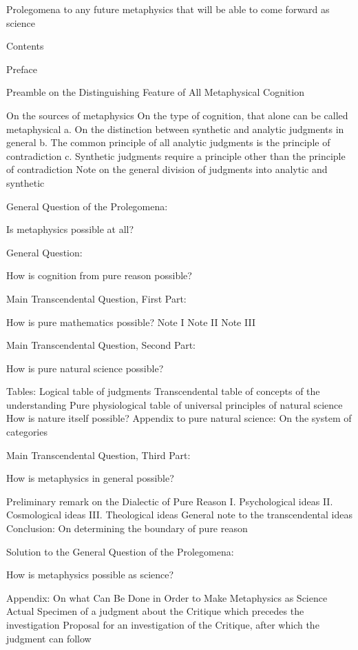 Prolegomena to any future metaphysics
that will be able to come forward as science

Contents

Preface

Preamble on the Distinguishing Feature of All Metaphysical Cognition

    On the sources of metaphysics
    On the type of cognition,
    that alone can be called metaphysical
        a. On the distinction between
        synthetic and analytic judgments in general
        b. The common principle of all analytic judgments is
        the principle of contradiction
        c. Synthetic judgments require a principle other than
        the principle of contradiction
    Note on the general division of judgments
    into analytic and synthetic

General Question of the Prolegomena:

    Is metaphysics possible at all?

General Question:

    How is cognition from pure reason possible?

Main Transcendental Question, First Part:

    How is pure mathematics possible?
    Note I
    Note II
    Note III

Main Transcendental Question, Second Part:

    How is pure natural science possible?

    Tables: Logical table of judgments
        Transcendental table of
        concepts of the understanding
        Pure physiological table of
        universal principles of natural science
    How is nature itself possible?
    Appendix to pure natural science: On the system of categories

Main Transcendental Question, Third Part:

    How is metaphysics in general possible?

    Preliminary remark on the Dialectic of Pure Reason
    I. Psychological ideas
    II. Cosmological ideas
    III. Theological ideas
    General note to the transcendental ideas
    Conclusion: On determining the boundary of pure reason

Solution to the General Question of the Prolegomena:

    How is metaphysics possible as science?

Appendix: On what Can Be Done in Order to
Make Metaphysics as Science Actual
    Specimen of a judgment about the Critique
    which precedes the investigation
    Proposal for an investigation of the Critique,
    after which the judgment can follow

